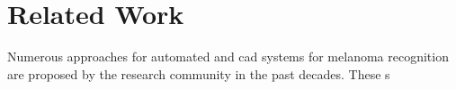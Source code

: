 \section{Related Work}
\label{sec:rw}
Numerous approaches for automated and \ac{cad} systems for melanoma recognition are proposed by the research community in the past decades.
These s